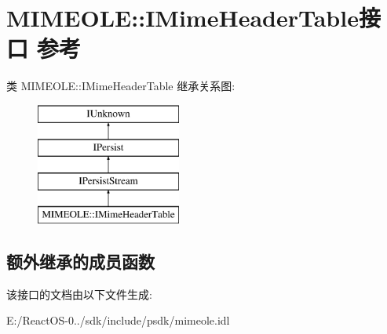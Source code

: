 \hypertarget{interface_m_i_m_e_o_l_e_1_1_i_mime_header_table}{}\section{M\+I\+M\+E\+O\+LE\+:\+:I\+Mime\+Header\+Table接口 参考}
\label{interface_m_i_m_e_o_l_e_1_1_i_mime_header_table}
类 M\+I\+M\+E\+O\+LE\+:\+:I\+Mime\+Header\+Table 继承关系图\+:\begin{figure}[H]
\begin{center}
\leavevmode
\includegraphics[height=4.000000cm]{interface_m_i_m_e_o_l_e_1_1_i_mime_header_table}
\end{center}
\end{figure}
\subsection*{额外继承的成员函数}


该接口的文档由以下文件生成\+:\begin{DoxyCompactItemize}
\item 
E\+:/\+React\+O\+S-\/0../sdk/include/psdk/mimeole.\+idl\end{DoxyCompactItemize}
